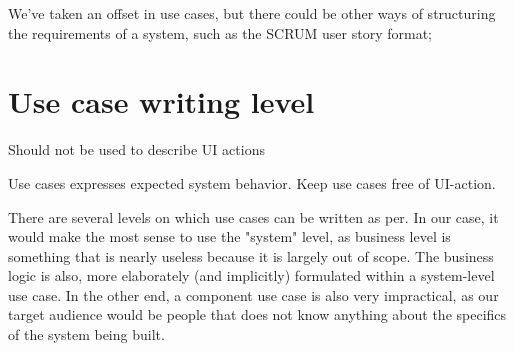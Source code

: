We've taken an offset in use cases, but there could be other ways of structuring the requirements of a system, such as the SCRUM user story format;


\section{Use case writing level}
Should not be used to describe UI actions%

Use cases expresses expected system behavior. Keep use cases free of UI-action.

There are several levels on which use cases can be written as per\cite{cockburn??}. In our case, it would make the most sense to use the "system" level, as business level is something that is nearly useless because it is largely out of scope. The business logic is also, more elaborately (and implicitly) formulated within a system-level use case. In the other end, a component use case is also very impractical, as our target audience would be people that does not know anything about the specifics of the system being built.


